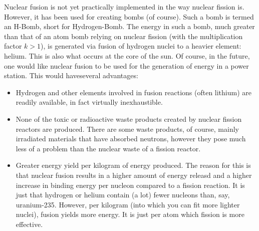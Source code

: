 Nuclear fusion is not yet practically implemented in the way nuclear fission is. However, it has been used for creating bombs (of course). Such a bomb is termed an H-Bomb, short for Hydrogen-Bomb. The energy in such a bomb, much greater than that of an atom bomb relying on nuclear fission (with the multiplication factor $k > 1$), is generated via fusion of hydrogen nuclei to a heavier element: helium. This is also what occurs at the core of the sun. Of course, in the future, one would like nuclear fusion to be used for the generation of energy in a power station. This would haveseveral advantages:

\begin{itemize}
	
	\item Hydrogen and other elements involved in fusion reactions (often lithium) are readily available, in fact virtually inexhaustible.

	\item None of the toxic or radioactive waste products created by nuclear fission reactors are produced. There are some waste products, of course, mainly irradiated materials that have absorbed neutrons, however they pose much less of a problem than the nuclear waste of a fission reactor.

	\item Greater energy yield per kilogram of energy produced. The reason for this is that nuclear fusion results in a higher amount of energy releasd and a higher increase in binding energy per nucleon compared to a fission reaction. It is just that hydrogen or helium contain (a lot) fewer nucleons than, say, uranium-235. However, per kilogram (into which you can fit more lighter nuclei), fusion yields more energy. It is just per atom which fission is more effective.

\end{itemize}




